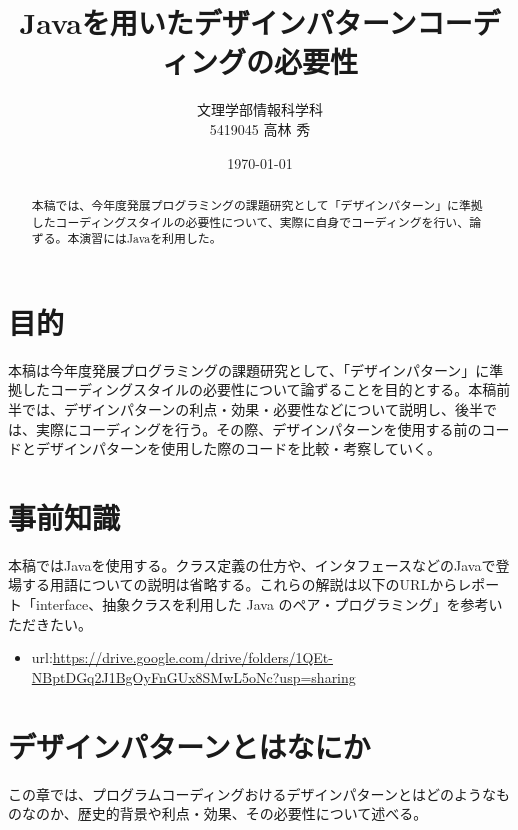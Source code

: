\documentclass[dvipdfmx]{jsarticle}
\title{Javaを用いたデザインパターンコーディングの必要性}
\author{文理学部情報科学科\\5419045 高林 秀}
\date{\today}
\begin{document}
\maketitle

\begin{abstract}
本稿では、今年度発展プログラミングの課題研究として「デザインパターン」に準拠したコーディングスタイルの必要性について、実際に自身でコーディングを行い、論ずる。本演習にはJavaを利用した。
\end{abstract}

\section{目的}
本稿は今年度発展プログラミングの課題研究として、「デザインパターン」に準拠したコーディングスタイルの必要性について論ずることを目的とする。本稿前半では、デザインパターンの利点・効果・必要性などについて説明し、後半では、実際にコーディングを行う。その際、デザインパターンを使用する前のコードとデザインパターンを使用した際のコードを比較・考察していく。
\section{事前知識}
本稿ではJavaを使用する。クラス定義の仕方や、インタフェースなどのJavaで登場する用語についての説明は省略する。これらの解説は以下のURLからレポート「interface、抽象クラスを利用した Java のペア・プログラミング」を参考いただきたい。
\begin{itemize}
  \item url:\url{https://drive.google.com/drive/folders/1QEt-NBptDGq2J1BgOyFnGUx8SMwL5oNc?usp=sharing}
\end{itemize}
\section{デザインパターンとはなにか}
この章では、プログラムコーディングおけるデザインパターンとはどのようなものなのか、歴史的背景や利点・効果、その必要性について述べる。\par
\end{document}

